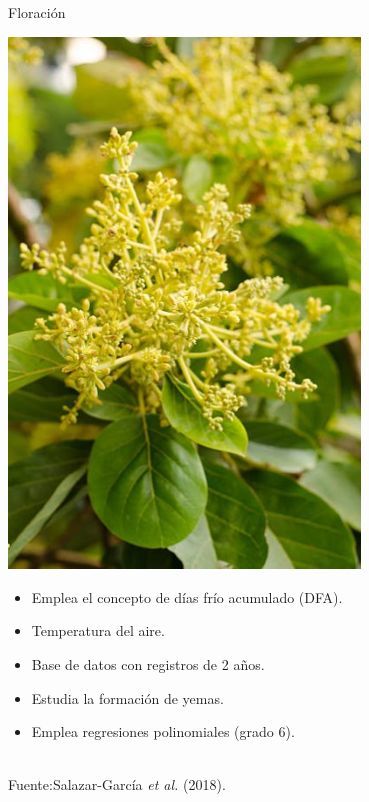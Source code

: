 \documentclass[aspectratio=169]{beamer}
\begin{document}
\begin{frame}{Floración}
    \vspace{0cm}
    \begin{minipage}{0.5\textwidth}
	   \vspace{-0.8cm}
            \centering
            \includegraphics[width=0.7\textwidth]{images/Floración.jpg}
		\end{minipage}%
		\begin{minipage}{0.5\textwidth}
            \vspace{-1cm}\begin{block}{}
                \begin{itemize}
				\item Emplea el concepto de días frío acumulado (DFA).
                \item Temperatura del aire.
                    \item Base de datos con registros de 2 años.
                    \item Estudia la formación de yemas.
                    \item Emplea regresiones polinomiales (grado 6).
                    \end{itemize}
            \end{block}
		\end{minipage}\\
    \hfill {\scriptsize Fuente:Salazar-García \textit{et al.} (2018).}
\end{frame}
\end{document}
